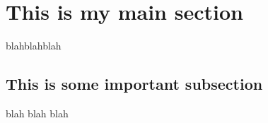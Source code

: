 \section{This is my main section}

blahblahblah

\subsection{This is some important subsection}

blah blah blah

